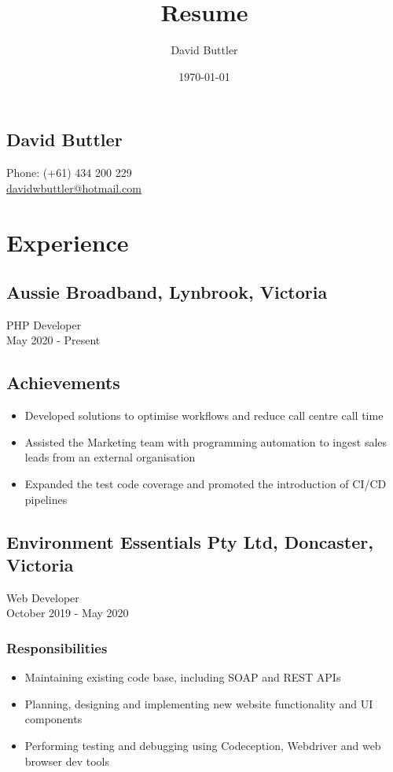 \documentclass[a4paper, 10pt]{article}
\begin{document}
\title{Resume}
\author{David Buttler}
\date{\today}
	\begin{center}	
	\section*{David Buttler}
		Phone: (+61) 434 200 229\\
		\href{mailto:davidwbuttler@hotmail.com}{davidwbuttler@hotmail.com}
	\end{center}
	\section*{Experience}
	\subsection*{Aussie Broadband, Lynbrook, Victoria}
		PHP Developer\\
		May 2020 - Present
	\subsection*{Achievements}
	\begin{itemize}
		\item Developed solutions to optimise workflows and reduce call centre call time
		\item Assisted the Marketing team with programming automation to ingest sales leads from an external organisation
		\item Expanded the test code coverage and promoted the introduction of CI/CD pipelines
	\end{itemize}
	\subsection*{Environment Essentials Pty Ltd, Doncaster, Victoria}
		Web Developer\\
		October 2019 - May 2020
	\subsubsection*{Responsibilities}
	\begin{itemize}
		\item Maintaining existing code base, including SOAP and REST APIs
		\item Planning, designing and implementing new website functionality and UI components
		\item Performing testing and debugging using Codeception, Webdriver and web browser dev tools
	\end{itemize}
\end{document}
